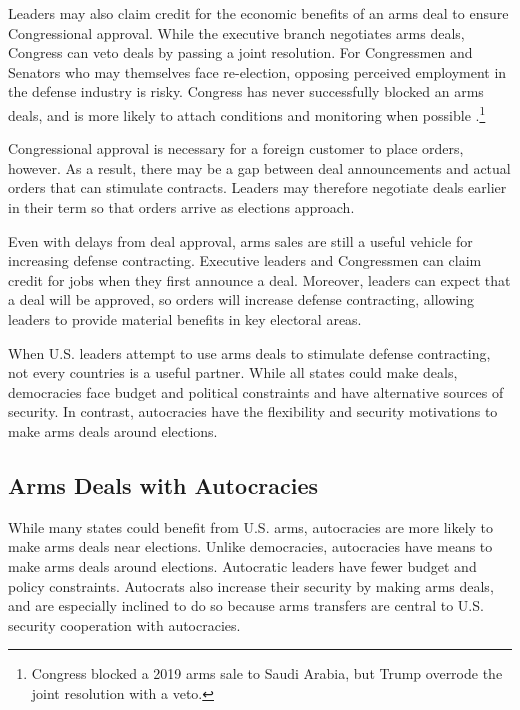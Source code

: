 \documentclass[12pt]{article}
\begin{document}

Leaders may also claim credit for the economic benefits of an arms deal to ensure Congressional approval. 
While the executive branch negotiates arms deals, Congress can veto deals by passing a joint resolution. 
For Congressmen and Senators who may themselves face re-election, opposing perceived employment in the defense industry is risky.
Congress has never successfully blocked an arms deals, and is more likely to attach conditions and monitoring when possible \citep{Thralletal2020}.\footnote{Congress blocked a 2019 arms sale to Saudi Arabia, but Trump overrode the joint resolution with a veto.}


Congressional approval is necessary for a foreign customer to place orders, however. 
As a result, there may be a gap between deal announcements and actual orders that can stimulate contracts.
Leaders may therefore negotiate deals earlier in their term so that orders arrive as elections approach.  


Even with delays from deal approval, arms sales are still a useful vehicle for increasing defense contracting. 
Executive leaders and Congressmen can claim credit for jobs when they first announce a deal. 
Moreover, leaders can expect that a deal will be approved, so orders will increase defense contracting, allowing leaders to provide material benefits in key electoral areas. 


When U.S. leaders attempt to use arms deals to stimulate defense contracting, not every countries is a useful partner. 
While all states could make deals, democracies face budget and political constraints and have alternative sources of security.
In contrast, autocracies have the flexibility and security motivations to make arms deals around elections.



\subsection{Arms Deals with Autocracies}


While many states could benefit from U.S. arms, autocracies are more likely to make arms deals near elections. 
Unlike democracies, autocracies have means to make arms deals around elections.
Autocratic leaders have fewer budget and policy constraints. 
Autocrats also increase their security by making arms deals, and are especially inclined to do so because arms transfers are central to U.S. security cooperation with autocracies.
\end{document}
